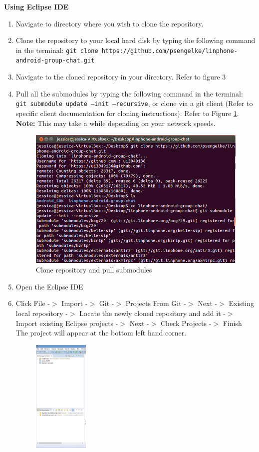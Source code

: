 \documentclass[11pt]{article}
\begin{document}
\textbf{Using Eclipse IDE}
\begin{enumerate}
\item Navigate to directory where you wish to clone the repository. 
\item Clone the repository to your local hard disk by typing the following command in the terminal: \newline
\texttt{git clone https://github.com/psengelke/linphone-android-group-chat.git}
\item Navigate to the cloned repository in your directory. Refer to figure 3
\item Pull all the submodules by typing the following command in the terminal: \texttt{git submodule update --init --recursive}, or clone via a git client (Refer to specific client documentation for cloning instructions). Refer to Figure \ref{cmd_clone}. \\
\textbf{Note:} This may take a while depending on your network speeds.
\begin{figure}[H]
\centering
\includegraphics[width=6in]{./images/clone.png}
\caption{Clone repository and pull submodules}
\label{cmd_clone}
\end{figure}
\item Open the Eclipse IDE
\item Click File -$>$ Import -$>$ Git -$>$ Projects From Git -$>$ Next -$>$ Existing local repository -$>$ Locate the newly cloned repository and add it -$>$ Import existing Eclipse projects -$>$ Next -$>$ Check Projects -$>$ Finish
\subitem The project will appear at the bottom left hand corner.
\begin{figure}[H]
\centering
\includegraphics[width=100px]{./images/git.png}

\end{figure}
\end{enumerate}
\end{document}
